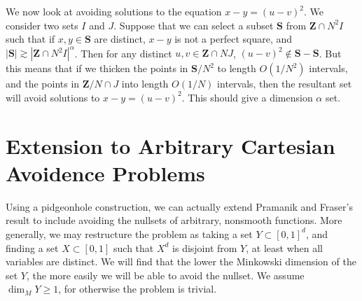\documentclass{report}
\theoremstyle{plain}
\theoremstyle{plain}
\begin{document}
We now look at avoiding solutions to the equation $x - y = (u - v)^2$. We consider two sets $I$ and $J$. Suppose that we can select a subset $\mathbf{S}$ from $\mathbf{Z} \cap N^2I$ such that if $x,y \in \mathbf{S}$ are distinct, $x - y$ is not a perfect square, and $|\mathbf{S}| \gtrsim |\mathbf{Z} \cap N^2I|^\alpha$. Then for any distinct $u,v \in \mathbf{Z} \cap NJ$, $(u - v)^2 \not \in \mathbf{S} - \mathbf{S}$. But this means that if we thicken the points in $\mathbf{S}/N^2$ to length $O(1/N^2)$ intervals, and the points in $\mathbf{Z}/N \cap J$ into length $O(1/N)$ intervals, then the resultant set will avoid solutions to $x - y = (u - v)^2$. This should give a dimension $\alpha$ set.










\chapter{Extension to Arbitrary Cartesian Avoidence Problems}

Using a pidgeonhole construction, we can actually extend Pramanik and Fraser's result to include avoiding the nullsets of arbitrary, nonsmooth functions. More generally, we may restructure the problem as taking a set $Y \subset [0,1]^d$, and finding a set $X \subset [0,1]$ such that $X^d$ is disjoint from $Y$, at least when all variables are distinct. We will find that the lower the Minkowski dimension of the set $Y$, the more easily we will be able to avoid the nullset. We assume $\dim_M Y \geq 1$, for otherwise the problem is trivial.
\end{document}
